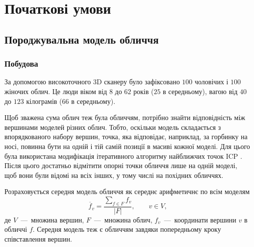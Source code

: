 \section{Початкові умови}

\subsection{Породжувальна модель обличчя}

\subsubsection{Побудова}

За допомогою високоточного 3D сканеру
було зафіксовано $100$ чоловічих і $100$ жіночих облич.
Це люди віком від $8$ до $62$ років ($25$ в середньому),
вагою від $40$ до $123$ кілограмів ($66$ в середньому).

Щоб зважена сума облич теж була обличчям,
потрібно знайти відповідність між вершинами моделей різних облич.
Тобто, оскільки модель складається з впорядкованого набору вершин,
точка, яка відповідає, наприклад, за горбинку на носі,
повинна бути на одній і тій самій позиції в масиві кожної моделі.
Для цього була використана модифікація
ітеративного алгоритму найближчих точок ICP \cite{AmbergRV07}.
Після цього достатньо відмітити опорні точки обличчя лише на одній моделі,
щоб вони були відомі на всіх інших,
у тому числі на похідних обличчях.

Розраховується середня модель обличчя як середнє арифметичнє по всім моделям
\begin{equation*}
  \overline{f}_v
  = \frac{\sum\limits_{f \in F} f_v}{\left| F \right|},\qquad
  v \in V,
\end{equation*}
де $V$~---~множина вершин, $F$~---~множина облич,
$f_v$~---~координати вершини $v$ в обличчі $f$.
Середня модель теж є обличчям завдяки попередньому кроку співставлення вершин.

